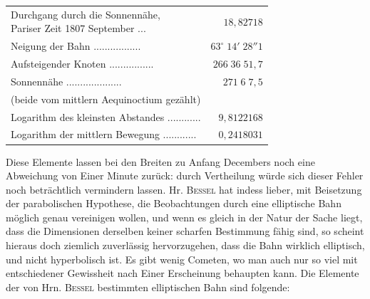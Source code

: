 \begin{center}\fontsize{9}{11}\selectfont\setlength{\tabcolsep}{3pt}\renewcommand{\arraystretch}{1.15}\begin{tabular}{lr}
\shortstack[l]{Durchgang durch die Sonnennähe,\\Pariser Zeit 1807 September} .\;.\;.\; & $18{,}82718$\\
Neigung der Bahn .\;.\;.\;.\;.\;.\;.\;.\;.\;.\;.\;.\;.\;.\;.\;.\;.\; & $63^\circ\;14'\;28''1$\\
Aufsteigender Knoten .\;.\;.\;.\;.\;.\;.\;.\;.\;.\;.\;.\;.\;.\;.\;.\; & $266\;36\;51{,}7$\\
Sonnennähe .\;.\;.\;.\;.\;.\;.\;.\;.\;.\;.\;.\;.\;.\;.\;.\;.\;.\;.\;.\; & $271\;6\;7{,}5$\\
\multicolumn{2}{l}{(beide vom mittlern Aequinoctium gezählt)}\\
Logarithm des kleinsten Abstandes .\;.\;.\;.\;.\;.\;.\;.\;.\;.\;.\;.\; & $9{,}8122168$\\
Logarithm der mittlern Bewegung .\;.\;.\;.\;.\;.\;.\;.\;.\;.\;.\;.\; & $0{,}2418031$\\
\end{tabular}\end{center}


\par\indent Diese Elemente lassen bei den Breiten zu Anfang Decembers noch eine Abweichung von Einer
Minute zurück: durch Vertheilung würde sich dieser Fehler noch beträchtlich vermindern
lassen. Hr. \textsc{Bessel} hat indess lieber, mit Beisetzung der parabolischen Hypothese, die
Beobachtungen durch eine elliptische Bahn möglich genau vereinigen wollen, und wenn es
gleich in der Natur der Sache liegt, dass die Dimensionen derselben keiner scharfen
Bestimmung fähig sind, so scheint hieraus doch ziemlich zuverlässig hervorzugehen, dass
die Bahn wirklich elliptisch, und nicht hyperbolisch ist. Es gibt wenig Cometen, wo man
auch nur so viel mit entschiedener Gewissheit nach Einer Erscheinung behaupten kann. Die
Elemente der von Hrn. \textsc{Bessel} bestimmten elliptischen Bahn sind folgende:


